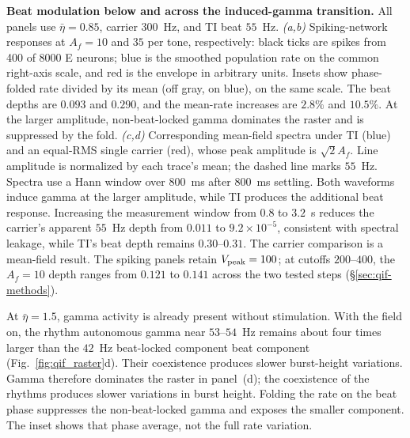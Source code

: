 \documentclass[11pt,a4paper]{article}
\providecommand{\DIFaddtex}[1]{{\protect\color{blue} \sf #1}} %
\providecommand{\DIFdeltex}[1]{{\protect\color{red} \scriptsize #1}} %
\providecommand{\DIFaddbegin}{} %
\providecommand{\DIFaddend}{} %
\providecommand{\DIFdelbegin}{} %
\providecommand{\DIFdelend}{} %
\providecommand{\DIFdelFL}[1]{\DIFdel{#1}} %
\providecommand{\DIFadd}[1]{\texorpdfstring{\DIFaddtex{#1}}{#1}} %
\providecommand{\DIFdel}[1]{\texorpdfstring{\DIFdeltex{#1}}{}} %
\begin{document}
{%
\DIFdelFL{\textbf{Beat modulation below and across the induced-gamma transition.}
All panels use $\bar\eta=0.85$, carrier $300$~Hz, and TI beat $55$~Hz.
\emph{(a,b)} Spiking-network responses at $A_f=10$ and $35$ per tone, respectively:
black ticks are spikes from 400 of 8000 E neurons; blue is the smoothed population
rate on the common right-axis scale, and red is the envelope in arbitrary units.
Insets show phase-folded rate divided by its mean (off gray, on blue), on the
same scale. The beat depths are $0.093$ and $0.290$, and the mean-rate increases
are $2.8\%$ and $10.5\%$. At the larger amplitude, non-beat-locked gamma dominates
the raster and is suppressed by the fold.
\emph{(c,d)} Corresponding mean-field spectra under TI (blue) and an equal-RMS
single carrier (red), whose peak amplitude is $\sqrt{2}A_f$. Line amplitude is
normalized by each trace's mean; the dashed line marks $55$~Hz. Spectra use a
Hann window over $800$~ms after $800$~ms settling. Both waveforms induce gamma
at the larger amplitude, while TI produces the additional beat response.
Increasing the measurement window from $0.8$ to $3.2$~s reduces
the carrier's apparent $55$~Hz depth from $0.011$ to $9.2\times10^{-5}$,
consistent with spectral leakage, while TI's beat depth remains $0.30$--$0.31$. The carrier comparison is a mean-field result. The spiking
panels retain $V_{\rm peak}=100$; at cutoffs $200$--$400$, the $A_f=10$
depth ranges from $0.121$ to $0.141$ across the two tested steps
(\S\ref{sec:qif-methods}).}}

\DIFdelend At $\bar\eta=1.5$, \DIFdelbegin \DIFdel{gamma activity is already present without stimulation. With the
field on, the rhythm }\DIFdelend \DIFaddbegin \DIFadd{autonomous gamma }\DIFaddend near $53$--$54$~Hz remains about
four times larger than the $42$~Hz \DIFdelbegin \DIFdel{beat-locked component }\DIFdelend \DIFaddbegin \DIFadd{beat component (Fig.~\ref{fig:qif_raster}d).
Their coexistence produces slower burst-height variations}\DIFaddend . \DIFdelbegin \DIFdel{Gamma therefore dominates the raster in panel~(d);
the coexistence of the rhythms produces slower variations in burst height. Folding the
rate on the beat phase suppresses the non-beat-locked gamma and exposes the smaller
component. The inset shows that phase average, not the full rate variation.
}%
\end{document}
